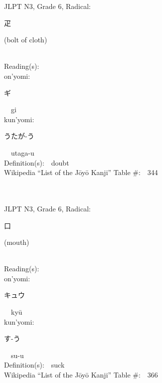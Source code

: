 \begin{multicols}{2}
{JLPT N3, Grade 6, Radical:\ \ {\begin{CJK}{UTF8}{min} 疋 \end{CJK}} (bolt of cloth) } \\
Reading(s):\ \ \\
{\hspace*{1em}}on'yomi:\ \ \\
{\hspace*{2em}}{\begin{CJK}{UTF8}{min} ギ \end{CJK}}\ \ gi\ \ \\
{\hspace*{1em}}kun'yomi:\ \ \\
{\hspace*{2em}}{\begin{CJK}{UTF8}{min} うたが-う \end{CJK}}\ \ utaga-u\ \ \\
Definition(s):\ \ doubt \\
Wikipedia ``List of the J\=oy\=o Kanji'' Table \#:\ \ 344 \\
\ \ \\
{\fontsize{34pt}{40pt}  }\ \ \\  %
{JLPT N3, Grade 6, Radical:\ \ {\begin{CJK}{UTF8}{min} 口 \end{CJK}} (mouth) } \\
Reading(s):\ \ \\
{\hspace*{1em}}on'yomi:\ \ \\
{\hspace*{2em}}{\begin{CJK}{UTF8}{min} キュウ \end{CJK}}\ \ ky\=u\ \ \\
{\hspace*{1em}}kun'yomi:\ \ \\
{\hspace*{2em}}{\begin{CJK}{UTF8}{min} す-う \end{CJK}}\ \ su-u\ \ \\
Definition(s):\ \ suck \\
Wikipedia ``List of the J\=oy\=o Kanji'' Table \#:\ \ 366 \\
\ \ \\
{\fontsize{34pt}{40pt}  }\ \ \\  %

\end{multicols}
